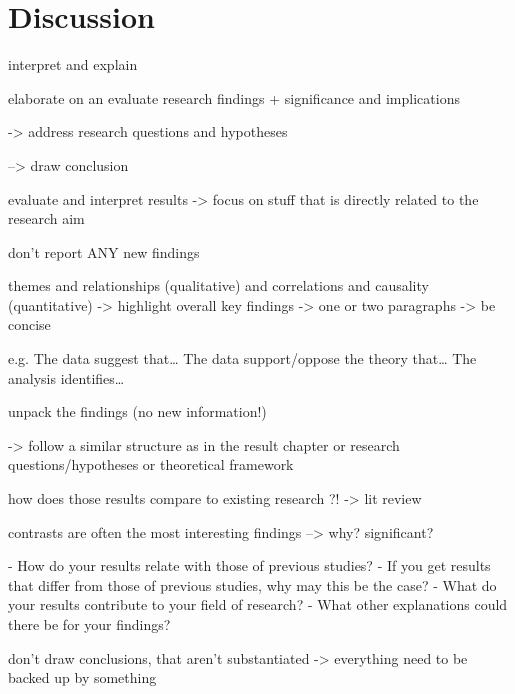 
\chapter{Discussion} %

\label{Chapter5} %




interpret and explain

elaborate on an evaluate research findings + significance and implications

-> address research questions and hypotheses

--> draw conclusion

evaluate and interpret results
-> focus on stuff that is directly related to the research aim

don't report ANY new findings


themes and relationships (qualitative) and correlations and causality (quantitative)
-> highlight overall key findings
-> one or two paragraphs -> be concise

e.g.
The data suggest that…
The data support/oppose the theory that…
The analysis identifies…


unpack the findings (no new information!)

-> follow a similar structure as in the result chapter
or research questions/hypotheses
or theoretical framework

how does those results compare to existing research ?! -> lit review

contrasts are often the most interesting findings --> why? significant?

- How do your results relate with those of previous studies?
- If you get results that differ from those of previous studies, why may this be the case?
- What do your results contribute to your field of research?
- What other explanations could there be for your findings?

don't draw conclusions, that aren't substantiated -> everything need to be backed up by something


